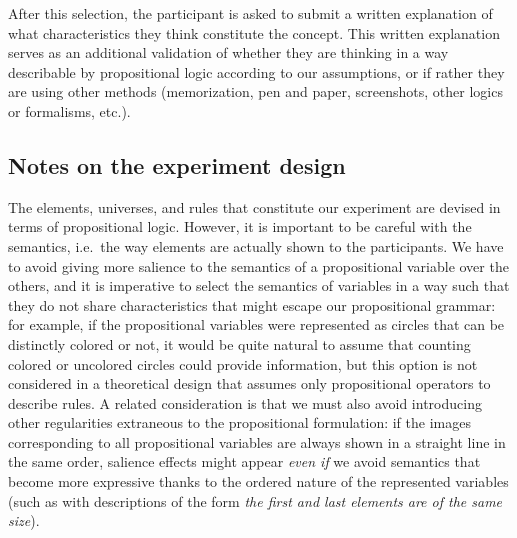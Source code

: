 After this selection, the participant is asked to submit a written explanation of what characteristics they think constitute the concept. This written explanation serves as an additional validation of whether they are thinking in a way describable by propositional logic according to our assumptions, or if rather they are using other methods (memorization, pen and paper, screenshots, other logics or formalisms, etc.). 


\subsection{Notes on the experiment design}\label{Experiment_design}

The elements, universes, and rules that constitute our experiment are devised in terms of propositional logic. However, it is important to be careful with the semantics, i.e.\ the way elements are actually shown to the participants. We have to avoid giving more salience to the semantics of a propositional variable over the others, and it is imperative to select the semantics of variables in a way such that they do not share characteristics that might escape our propositional grammar: for example, if the propositional variables were represented as circles that can be distinctly colored or not, it would be quite natural to assume that counting colored or uncolored circles could provide information, but this option is not considered in a theoretical design that assumes only propositional operators to describe rules. A related consideration is that we must also avoid introducing other regularities extraneous to the propositional formulation: if the images corresponding to all propositional variables are always shown in a straight line in the same order, salience effects might appear \textit{even if }we avoid semantics that become more expressive thanks to the ordered nature of the represented variables (such as with descriptions of the form \textit{the first and last elements are of the same size}).


